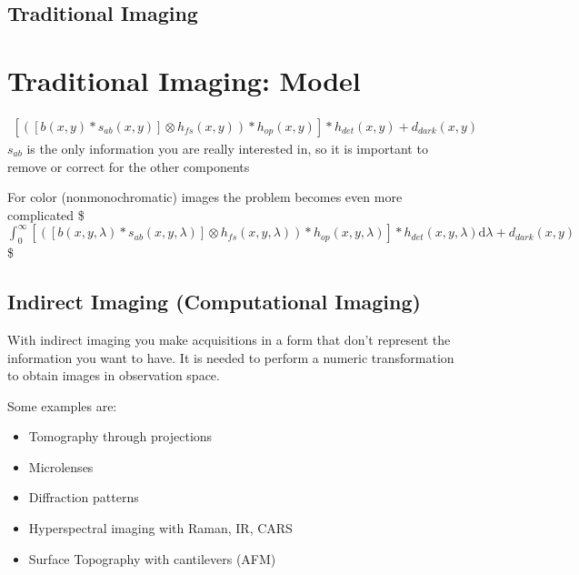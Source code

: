 \documentclass[letterpaper,10pt,english]{sphinxmanual}
\begin{document}
\subsection{Traditional Imaging}
\label{\detokenize{01-Introduction:traditional-imaging}}





\section{Traditional Imaging: Model}
\label{\detokenize{01-Introduction:traditional-imaging-model}}
\sphinxAtStartPar
{}
\begin{equation*}
\begin{split}
\left[\left([b(x,y)*s_{ab}(x,y)]\otimes h_{fs}(x,y)\right)*h_{op}(x,y)\right]*h_{det}(x,y)+d_{dark}(x,y)
\end{split}
\end{equation*}
\sphinxAtStartPar
\(s_{ab}\) is the only information you are really interested in, so it is important to remove or correct for the other components

\sphinxAtStartPar
For color (non\sphinxhyphen{}monochromatic) images the problem becomes even more complicated
\$\(
\int_{0}^{\infty} {\left[\left([b(x,y,\lambda)*s_{ab}(x,y,\lambda)]\otimes h_{fs}(x,y,\lambda)\right)*h_{op}(x,y,\lambda)\right]*h_{det}(x,y,\lambda)}\mathrm{d}\lambda+d_{dark}(x,y)
\)\$


\subsection{Indirect Imaging (Computational Imaging)}
\label{\detokenize{01-Introduction:indirect-imaging-computational-imaging}}
\sphinxAtStartPar
With indirect imaging you make acquisitions in a form that don’t represent the information you want to have. It is needed to perform a numeric transformation to obtain images in observation space.

\sphinxAtStartPar
Some examples are:
\begin{itemize}
\item {} 
\sphinxAtStartPar
Tomography through projections

\item {} 
\sphinxAtStartPar
Microlenses 

\item {} 
\sphinxAtStartPar
Diffraction patterns

\item {} 
\sphinxAtStartPar
Hyperspectral imaging with Raman, IR, CARS

\item {} 
\sphinxAtStartPar
Surface Topography with cantilevers (AFM)

\end{itemize}
\end{document}
